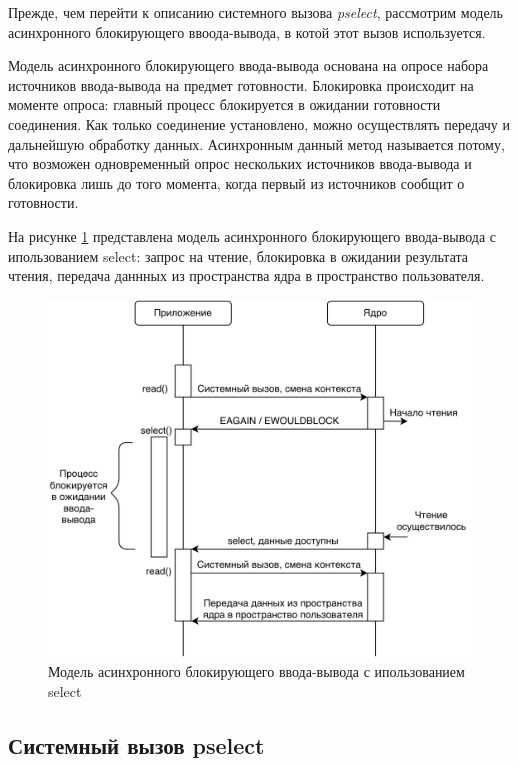Прежде, чем перейти к описанию системного вызова \textit{pselect}, рассмотрим модель асинхронного блокирующего ввоода-вывода, в котой этот вызов используется.

Модель асинхронного блокирующего ввода-вывода основана на опросе набора источников ввода-вывода на предмет готовности. Блокировка происходит на моменте опроса: главный процесс блокируется в ожидании готовности соединения. Как только соединение установлено, можно осуществлять передачу и дальнейшую обработку данных. Асинхронным данный метод называется потому, что возможен одновременный опрос нескольких источников ввода-вывода и блокировка лишь до того момента, когда первый из источников сообщит о готовности.

На рисунке \ref{fig:select} представлена модель асинхронного блокирующего ввода-вывода с ипользованием select: запрос  на чтение, блокировка в ожидании результата чтения, передача даннных из пространства ядра в пространство пользователя.

\begin{figure}[h!]
	\centering
	\captionsetup{justification=centering}
	\includegraphics[width=150mm]{img/select.png}
	\caption{Модель асинхронного блокирующего ввода-вывода с ипользованием select}
	\label{fig:select}
\end{figure}



\subsection{Системный вызов pselect}

